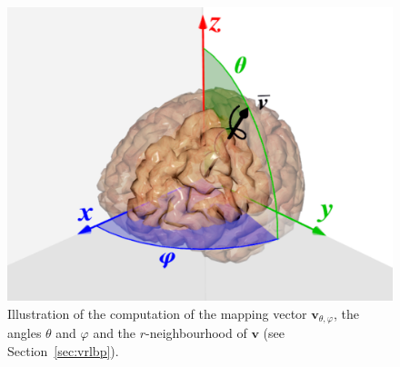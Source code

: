 \begin{figure}[htp]
	\centering
	\includegraphics[width=0.8\columnwidth]{gfx/ch6/02-projection}
	\caption{Illustration of the computation of the mapping vector $\mathbf{v}_{\theta,\varphi}$, the angles $\theta$ and $\varphi$ and the $r$-neighbourhood of $\mathbf{v}$ (see Section~\ref{sec:vrlbp}).}
	\label{fig:brainmapping}
\end{figure}

